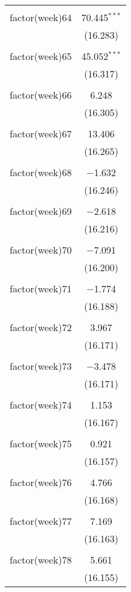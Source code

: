 \documentclass{article}
\begin{document}
\begin{table}[!htbp]
\begin{tabular}{@{\extracolsep{5pt}}lc}
  & \\ 
 factor(week)64 & 70.445$^{***}$ \\ 
  & (16.283) \\ 
  & \\ 
 factor(week)65 & 45.052$^{***}$ \\ 
  & (16.317) \\ 
  & \\ 
 factor(week)66 & 6.248 \\ 
  & (16.305) \\ 
  & \\ 
 factor(week)67 & 13.406 \\ 
  & (16.265) \\ 
  & \\ 
 factor(week)68 & $-$1.632 \\ 
  & (16.246) \\ 
  & \\ 
 factor(week)69 & $-$2.618 \\ 
  & (16.216) \\ 
  & \\ 
 factor(week)70 & $-$7.091 \\ 
  & (16.200) \\ 
  & \\ 
 factor(week)71 & $-$1.774 \\ 
  & (16.188) \\ 
  & \\ 
 factor(week)72 & 3.967 \\ 
  & (16.171) \\ 
  & \\ 
 factor(week)73 & $-$3.478 \\ 
  & (16.171) \\ 
  & \\ 
 factor(week)74 & 1.153 \\ 
  & (16.167) \\ 
  & \\ 
 factor(week)75 & 0.921 \\ 
  & (16.157) \\ 
  & \\ 
 factor(week)76 & 4.766 \\ 
  & (16.168) \\ 
  & \\ 
 factor(week)77 & 7.169 \\ 
  & (16.163) \\ 
  & \\ 
 factor(week)78 & 5.661 \\ 
  & (16.155) \\ 

\end{tabular}
\end{table}
\end{document}

